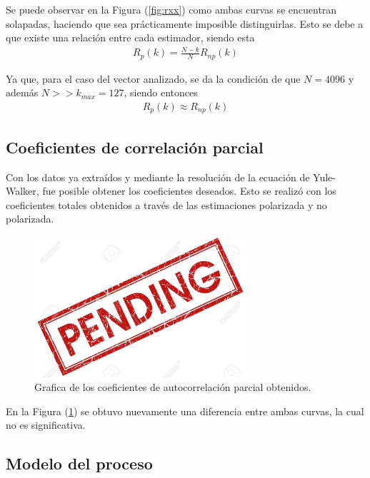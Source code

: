Se puede observar en la Figura (\ref{fig:rxx}) como ambas curvas se encuentran solapadas, haciendo que sea prácticamente imposible distinguirlas.
Esto se debe a que existe una relación entre cada estimador, siendo esta
\begin{equation*}
\begin{gathered}
	R_{p}(k) = \frac{N - k}{N} R_{np}(k)
\end{gathered}
\end{equation*}

Ya que, para el caso del vector analizado, se da la condición de que $N = 4096$ y además $N >> k_{max} = 127$, siendo entonces
\begin{equation*}
\begin{gathered}
	R_{p}(k) \approx R_{np}(k)
\end{gathered}
\end{equation*}

\subsection{Coeficientes de correlación parcial}

Con los datos ya extraídos y mediante la resolución de la ecuación de Yule-Walker, fue posible obtener los coeficientes deseados. Esto se realizó con los coeficientes totales obtenidos a través de las estimaciones polarizada y no polarizada.
\begin{figure}[H]
\centering
	\includegraphics[width=0.7\textwidth, trim = {0 0 0 0},clip]{./Imagenes/pend.jpg}
	\caption{Grafica de los coeficientes de autocorrelación parcial obtenidos.}
	\label{fig:phikk}
\end{figure}

En la Figura (\ref{fig:phikk}) se obtuvo nuevamente una diferencia entre ambas curvas, la cual no es significativa.

\subsection{Modelo del proceso}
\label{subsec:modelo}

